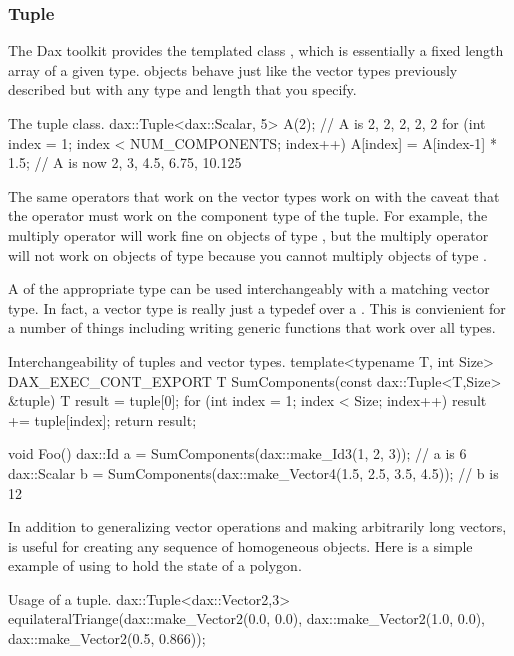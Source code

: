\subsubsection{Tuple}

The Dax toolkit provides the templated class ,
which is essentially a fixed length array of a given type. 
objects behave just like the vector types previously described but with any
type and length that you specify.

\begin{daxexample}{The tuple class.}
dax::Tuple<dax::Scalar, 5> A(2);  // A is {2, 2, 2, 2, 2}
for (int index = 1; index < NUM_COMPONENTS; index++)
  {
  A[index] = A[index-1] * 1.5;
  }
// A is now {2, 3, 4.5, 6.75, 10.125}
\end{daxexample}

The same operators that work on the vector types work on  with
the caveat that the operator must work on the component type of the
tuple. For example, the multiply operator will work fine on objects of type
, but the multiply operator will not work on objects
of type  because you cannot multiply
objects of type .

A  of the appropriate type can be used interchangeably with a
matching vector type. In fact, a vector type is really just a typedef over
a . This is convienient for a number of things including writing
generic functions that work over all types.

\begin{daxexample}{Interchangeability of tuples and vector types.}
template<typename T, int Size>
DAX_EXEC_CONT_EXPORT
T SumComponents(const dax::Tuple<T,Size> &tuple)
{
  T result = tuple[0];
  for (int index = 1; index < Size; index++)
    {
    result += tuple[index];
    }
  return result;
}

void Foo()
{
  dax::Id a = SumComponents(dax::make_Id3(1, 2, 3));                    // a is 6
  dax::Scalar b = SumComponents(dax::make_Vector4(1.5, 2.5, 3.5, 4.5)); // b is 12
}
\end{daxexample}

In addition to generalizing vector operations and making arbitrarily long
vectors,  is useful for creating any sequence of homogeneous
objects. Here is a simple example of using  to hold the state of
a polygon.

\begin{daxexample}{Usage of a tuple.}
dax::Tuple<dax::Vector2,3> equilateralTriange(dax::make_Vector2(0.0, 0.0),
                                              dax::make_Vector2(1.0, 0.0),
                                              dax::make_Vector2(0.5, 0.866));
\end{daxexample}

